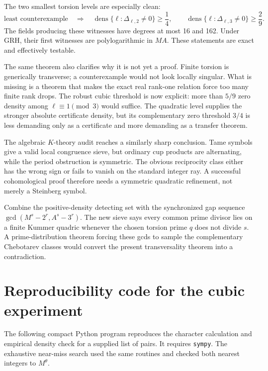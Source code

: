\documentclass[11pt]{article}
\numberwithin{equation}{section}
\theoremstyle{definition}
\theoremstyle{remark}
\newcommand{\dens}{\operatorname{dens}}
\begin{document}
The two smallest torsion levels are especially clean:
\[
 \boxed{\text{least counterexample}\quad\Longrightarrow\quad
 \dens\{\ell:\Delta_{\ell,2}\ne0\}\ge\frac14,
 \qquad
 \dens\{\ell:\Delta_{\ell,3}\ne0\}\ge\frac29.}
\]
The fields producing these witnesses have degrees at most 16 and 162.  Under GRH, their first
witnesses are polylogarithmic in \(MA\).  These statements are exact and effectively
testable.

The same theorem also clarifies why it is not yet a proof.  Finite torsion is generically
transverse; a counterexample would not look locally singular.  What is missing is a theorem
that makes the exact real rank-one relation force too many finite rank drops.  The robust cubic threshold is now explicit: more than \(5/9\) zero density among
\(\ell\equiv1\pmod3\) would suffice.  The quadratic level supplies the stronger absolute
certificate density, but its complementary zero threshold \(3/4\) is less demanding only as
a certificate and more demanding as a transfer theorem.

The algebraic \(K\)-theory audit reaches a similarly sharp conclusion.  Tame symbols give a
valid local congruence sieve, but ordinary cup products are alternating, while the period
obstruction is symmetric.  The obvious reciprocity class either has the wrong sign or fails
to vanish on the standard integer ray.  A successful cohomological proof therefore needs a
symmetric quadratic refinement, not merely a Steinberg symbol.

\begin{gapbox}
Combine the positive-density detecting set with the synchronized gap sequence
\(\gcd(M^s-2^r,A^s-3^r)\).  The new sieve says every common prime divisor lies on a finite
Kummer quadric whenever the chosen torsion prime \(q\) does not divide \(s\).  A prime-distribution theorem forcing these gcds to
sample the complementary Chebotarev classes would convert the present transversality theorem
into a contradiction.
\end{gapbox}

\appendix

\section{Reproducibility code for the cubic experiment}
\label{app:code}

The following compact Python program reproduces the character calculation and empirical
density check for a supplied list of pairs.  It requires \texttt{sympy}.  The exhaustive
near-miss search used the same routines and checked both nearest integers to \(M^\theta\).
\end{document}
